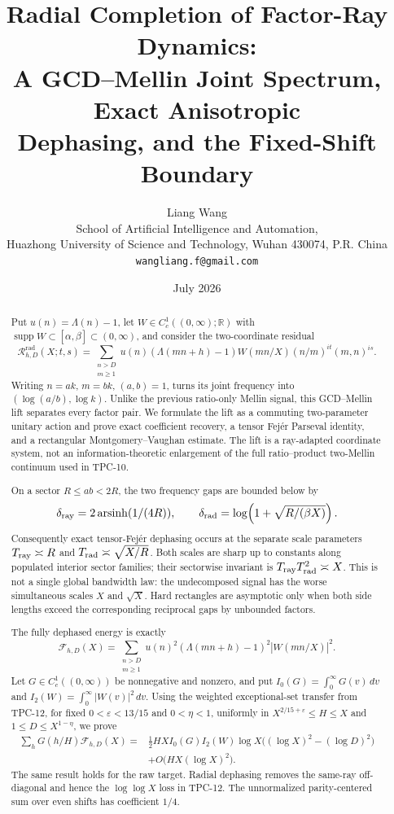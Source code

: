 \documentclass[11pt]{article}
\title{\textbf{Radial Completion of Factor-Ray Dynamics:}\\
\textbf{A GCD--Mellin Joint Spectrum, Exact Anisotropic}\\
\textbf{Dephasing, and the Fixed-Shift Boundary}}
\author{Liang Wang\\
\small School of Artificial Intelligence and Automation,\\[-0.2em]
\small Huazhong University of Science and Technology, Wuhan 430074, P.R. China\\
\small \texttt{wangliang.f@gmail.com}}
\date{July 2026}
\theoremstyle{definition}
\theoremstyle{remark}
\newcommand{\R}{\mathbb R}
\newcommand{\eps}{\varepsilon}
\newcommand{\cF}{\mathcal F}
\newcommand{\cR}{\mathcal R}
\newcommand{\supp}{\operatorname{supp}}
\newcommand{\arsinh}{\operatorname{arsinh}}
\newcommand{\rad}{\mathrm{rad}}
\begin{document}
\maketitle

\begin{abstract}
Put $u(n)=\Lambda(n)-1$, let $W\in C_c^1((0,\infty);\R)$ with
$\supp W\subset[\alpha,\beta]\subset(0,\infty)$, and consider
the two-coordinate residual
\[
 \cR^{\rad}_{h,D}(X;t,s)=
 \sum_{\substack{n>D\\m\geq1}}
 u(n)(\Lambda(mn+h)-1)W(mn/X)
 (n/m)^{it}(m,n)^{is}.
\]
Writing $n=ak$, $m=bk$, $(a,b)=1$, turns its joint frequency into
$(\log(a/b),\log k)$.  Unlike the previous ratio-only Mellin signal,
this GCD--Mellin lift separates every factor pair.  We formulate the lift
as a commuting two-parameter unitary action and prove exact coefficient
recovery, a tensor Fej\'er Parseval identity, and a rectangular
Montgomery--Vaughan estimate.
The lift is a ray-adapted coordinate system, not an information-theoretic
enlargement of the full ratio--product two-Mellin continuum used in
TPC-10.

On a sector $R\leq ab<2R$, the two frequency gaps are bounded below by
\[
 \delta_{\rm ray}=2\arsinh(1/(4R)),\qquad
 \delta_{\rm rad}=\log\!\left(1+\sqrt{R/(\beta X)}\right).
\]
Consequently exact tensor-Fej\'er dephasing occurs at the separate scale
parameters
$T_{\rm ray}\asymp R$ and
$T_{\rm rad}\asymp\sqrt{X/R}$.  Both scales are sharp up to constants
along populated interior sector families; their sectorwise invariant is
$T_{\rm ray}T_{\rm rad}^2\asymp X$.  This is not a single global
bandwidth law: the undecomposed signal has the worse simultaneous scales
$X$ and $\sqrt X$.
Hard rectangles are asymptotic only when both side lengths exceed the
corresponding reciprocal gaps by unbounded factors.

The fully dephased energy is exactly
\[
 \cF_{h,D}(X)=
 \sum_{\substack{n>D\\m\geq1}}
 u(n)^2(\Lambda(mn+h)-1)^2|W(mn/X)|^2.
\]
Let $G\in C_c^1((0,\infty))$ be nonnegative and nonzero, and put
$I_0(G)=\int_0^\infty G(v)\,dv$ and
$I_2(W)=\int_0^\infty|W(v)|^2\,dv$.
Using the weighted exceptional-set transfer from TPC-12, for fixed
$0<\eps<13/15$ and $0<\eta<1$, uniformly in
$X^{2/15+\eps}\leq H\leq X$ and $1\leq D\leq X^{1-\eta}$, we prove
\begin{align*}
 \sum_hG(h/H)\cF_{h,D}(X)
 ={}&\frac12HX I_0(G)I_2(W)\log X
 \bigl((\log X)^2-(\log D)^2\bigr)\\
 &+O\bigl(HX(\log X)^2\bigr).
\end{align*}
The same result holds for the raw target.  Radial dephasing removes the
same-ray off-diagonal and hence the $\log\log X$ loss in TPC-12.  The
unnormalized parity-centered sum over even shifts has coefficient $1/4$.


\end{abstract}
\end{document}
